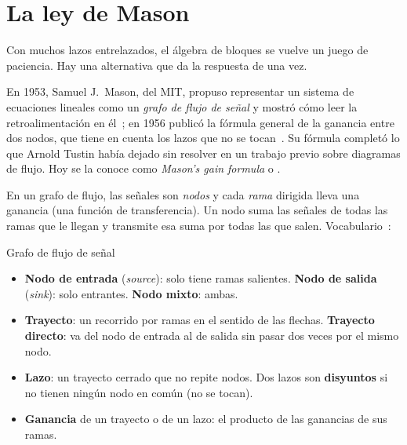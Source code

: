 \section{La ley de Mason}
\label{sec:so-mason}

Con muchos lazos entrelazados, el álgebra de bloques se vuelve un juego de paciencia. Hay una alternativa que da la respuesta de una vez.

\begin{historia}
En 1953, Samuel J.\ Mason, del MIT, propuso representar un sistema de ecuaciones lineales como un \emph{grafo de flujo de señal} y mostró cómo leer la retroalimentación en él~\citep{Mas53}; en 1956 publicó la fórmula general de la ganancia entre dos nodos, que tiene en cuenta los lazos que no se tocan~\citep{Mas56}. Su fórmula completó lo que Arnold Tustin había dejado sin resolver en un trabajo previo sobre diagramas de flujo. Hoy se la conoce como \emph{Mason's gain formula} o .
\end{historia}

En un grafo de flujo, las señales son \emph{nodos} y cada \emph{rama} dirigida lleva una ganancia (una función de transferencia). Un nodo suma las señales de todas las ramas que le llegan y transmite esa suma por todas las que salen. Vocabulario~\citep{ogata10}:

\begin{definicion}[label=def:so-grafo]{Grafo de flujo de señal}
\begin{itemize}
  \item \textbf{Nodo de entrada} (\emph{source}): solo tiene ramas salientes. \textbf{Nodo de salida} (\emph{sink}): solo entrantes. \textbf{Nodo mixto}: ambas.
  \item \textbf{Trayecto}: un recorrido por ramas en el sentido de las flechas. \textbf{Trayecto directo}: va del nodo de entrada al de salida sin pasar dos veces por el mismo nodo.
  \item \textbf{Lazo}: un trayecto cerrado que no repite nodos. Dos lazos son \textbf{disyuntos} si no tienen ningún nodo en común (no se tocan).
  \item \textbf{Ganancia} de un trayecto o de un lazo: el producto de las ganancias de sus ramas.
\end{itemize}
\end{definicion}

